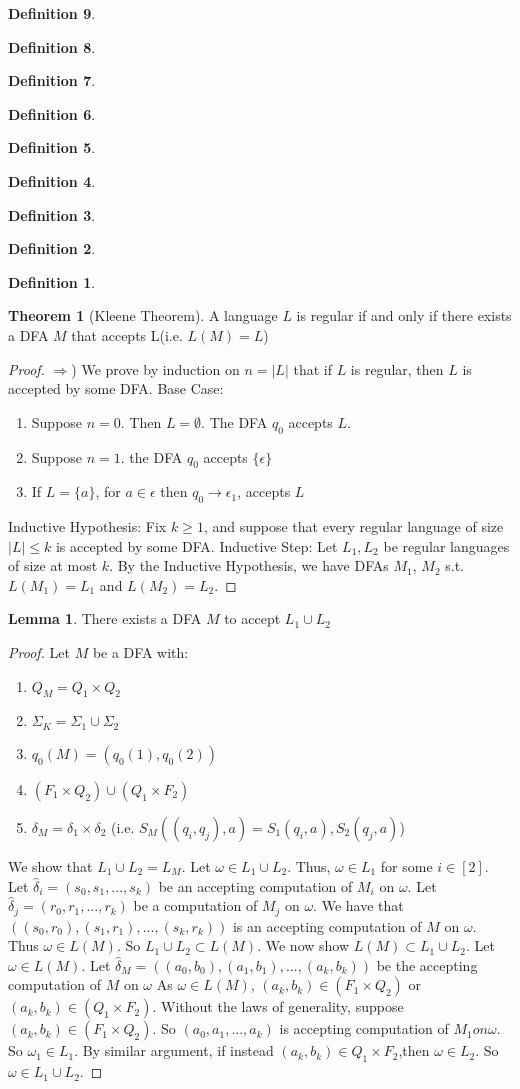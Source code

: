 \documentclass{article}
\theoremstyle{definition}
\newtheorem{define}{Definition}[section]
\newtheorem{thm}{Theorem}[section]
\newtheorem{lem}{Lemma}[section]
\begin{document}
\begin{define}
\begin{define}
\begin{define}
\begin{define}
\begin{define}
\begin{define}
\begin{define}
\begin{define}
\begin{define}
\begin{thm}[Kleene Theorem]
A language $L$ is regular if and only if there exists a DFA $M$ that accepts L(i.e. $L(M)=L$)
\end{thm}
\begin{proof}
$\Rightarrow$) We prove by induction on $n=|L|$ that if $L$ is regular, then $L$ is accepted by some DFA. Base Case: 
	\begin{enumerate}
		\item Suppose $n=0$. Then $L=\emptyset$. The DFA $q_0$ accepts $L$.
		\item Suppose $n=1$.	 the DFA $q_0$ accepts $\{\epsilon\}$
		\item If $L=\{a\}$, for $a \in \epsilon$ then $q_0 \rightarrow \epsilon_1$, accepts $L$ 
	\end{enumerate}
Inductive Hypothesis: Fix $k \geq 1$, and suppose that every regular language of size $|L| \leq k$ is accepted by some DFA. Inductive Step: Let $L_1, L_2$ be regular languages of size at most $k$. By the Inductive Hypothesis, we have DFAs $M_1$, $M_2$ s.t. $L(M_1)=L_1$ and $L(M_2)=L_2$.
\end{proof}

\begin{lem}
There exists a DFA $M$ to accept $L_1 \cup L_2$
\end{lem}
\begin{proof}
Let $M$ be a DFA with:
	\begin{enumerate}
		\item $Q_M=Q_1 \times Q_2$
		\item $\Sigma_K = \Sigma_1 \cup \Sigma_2$
		\item $q_0(M)=(q_0(1),q_0(2))$
		\item $(F_1 \times Q_2)\cup (Q_1 \times F_2)$
		\item $\delta_M = \delta_1 \times \delta_2$ (i.e. $S_M((q_i,q_j),a)=S_1(q_i,a),S_2(q_j,a)$)
	\end{enumerate} 
We show that $L_1 \cup L_2 = L_M$. Let $\omega \in L_1\cup L_2$. Thus, $\omega \in L_1$ for some $i\in [2]$. Let $\hat{\delta}_i=(s_0,s_1,...,s_k)$ be an accepting computation of $M_i$ on $\omega$. Let $\hat{\delta}_j=(r_0,r_1,...,r_k)$ be a computation of $M_j$ on $\omega$. We have that $((s_0,r_0),(s_1,r_1),...,(s_k,r_k))$ is an accepting computation of $M$ on $\omega$. Thus $\omega \in L(M)$. So $L_1\cup L_2 \subset L(M)$. We now show $L(M)\subset L_1\cup L_2$. Let $\omega \in L(M)$. Let $\hat{\delta}_M =((a_0,b_0),(a_1,b_1),...,(a_k,b_k))$ be the accepting computation of $M$ on $\omega$ As $\omega \in L(M)$, $(a_k,b_k)\in(F_1\times Q_2)$ or $(a_k,b_k)\in (Q_1\times F_2)$. Without the laws of generality, suppose $(a_k,b_k)\in(F_1\times Q_2)$. So $(a_0,a_1,...,a_k)$ is accepting computation of $M_1 on \omega$. So $\omega_1\in L_1$. By similar argument, if instead $(a_k,b_k)\in Q_1 \times F_2$,then $\omega \in L_2$. So $\omega \in L_1\cup L_2$.
\end{proof}


\end{define}
\end{define}
\end{define}
\end{define}
\end{define}
\end{define}
\end{define}
\end{define}
\end{define}
\end{document}
